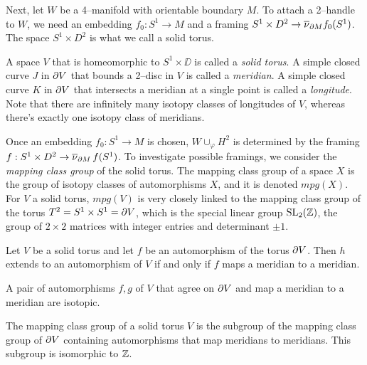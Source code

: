 Next, let $W$ be a 4--manifold with orientable boundary $M$.
To attach a 2--handle to $W$, we need an embedding $f_0:S^1\to M$ and a framing $S^1\times D^2\to\overline{\nu}_{\partial M}f_0(S^1)$.
The space $S^1\times D^2$ is what we call a solid torus.

\begin{defn}
	A space $V$ that is homeomorphic to $S^1\times\DD$ is called a \emph{solid torus}.	
	A simple closed curve $J$ in $\partial V$ that bounds a 2--disc in $V$ is called a \emph{meridian}.
	A simple closed curve $K$ in $\partial V$ that intersects a meridian at a single point is called a \emph{longitude}.
	Note that there are infinitely many isotopy classes of longitudes of $V$, whereas there's exactly one isotopy class of meridians.
\end{defn}

Once an embedding $f_0:S^1\to M$ is chosen, $W\cup_\varphi H^2$ is determined by the framing $f:S^1\times D^2\to \overline{\nu}_{\partial M}\,f(S^1)$.
To investigate possible framings, we consider the \emph{mapping class group} of the solid torus.
The mapping class group of a space $X$ is the group of isotopy classes of automorphisms $X$, and it is denoted $mpg(X)$.
For $V$ a solid torus, $mpg(V)$ is very closely linked to the mapping class group of the torus $T^2 = S^1\times S^1=\partial V$, which is the special linear group $\textrm{SL}_2(\mathbb{Z})$, the group of $2\times 2$ matrices with integer entries and determinant $\pm 1$.
\begin{lem}
	Let $V$ be a solid torus and let $f$ be an automorphism of the torus $\partial V$.
	Then $h$ extends to an automorphism of $V$ if and only if $f$ maps a meridian to a meridian.	
\end{lem}

\begin{lem}
	A pair of automorphisms $f,g$ of $V$ that agree on $\partial V$ and map a meridian to a meridian are isotopic.	
\end{lem}

\begin{theorem}
	The mapping class group of a solid torus $V$ is the subgroup of the mapping class group of $\partial V$ containing automorphisms that map meridians to meridians.
	This subgroup is isomorphic to $\mathbb{Z}$.	
\end{theorem}

